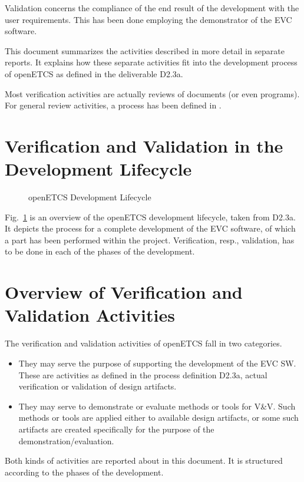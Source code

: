 \documentclass{template/openetcs_article}
\begin{document}
Validation concerns the compliance of the end result of the
development with the user requirements. This has been done employing
the demonstrator of the EVC software. 

This document summarizes the activities described in more detail in
separate reports. It explains how these separate activities fit into
the development process of openETCS as defined in the deliverable
D2.3a.    

Most verification activities are actually reviews of documents (or
even programs). For general review activities, a process has been
defined in \cite{openETCS:D1.3.1}. 

\newpage







\section{Verification and Validation in the Development Lifecycle}
\label{sec:Lifecycle}

\begin{figure}[hbt]
  \centering
  \def\svgwidth{.9\textwidth}
  {\tiny
  }
  \caption{openETCS Development Lifecycle}
  \label{fig:lifecycle2}
\end{figure}

Fig.~\ref{fig:lifecycle2} is an overview of the openETCS development
lifecycle, taken from D2.3a. It depicts the process for a complete
development of the EVC software, of which a part has been performed
within the project. Verification, resp., validation, has to be done in
each of the phases of the development.

\section{Overview of Verification and Validation Activities}
\label{sec:overview}


The verification and validation activities of openETCS fall in two
categories. 
\begin{itemize}
\item They may serve the purpose of supporting the development
of the EVC SW. These are activities as defined in the process
definition D2.3a, actual verification or validation of design
artifacts.
\item They may serve to demonstrate or evaluate methods or tools for
  V\&V. Such methods or tools are applied either to available design
  artifacts, or some such artifacts are created specifically for the
  purpose of the demonstration/evaluation.
\end{itemize}
Both kinds of activities are reported about in this document. It is
structured according to the phases of the development. 
\end{document}
